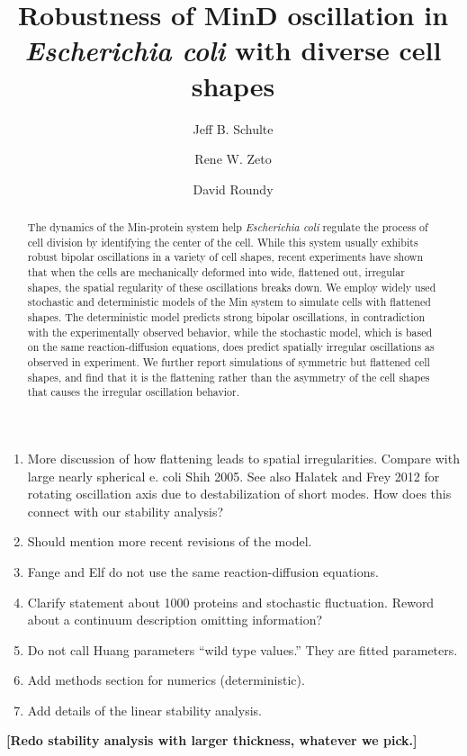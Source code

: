\documentclass[letterpaper,twocolumn,amsmath,amssymb,pre]{revtex4-1}
\newcommand{\red}[1]{{\bf \color{red} #1}}
\newcommand{\fixme}[1]{\red{[#1]}}
\begin{document}
{\begin{enumerate}
  \item More discussion of how flattening leads to spatial
    irregularities.  Compare with large nearly spherical e. coli Shih
    2005.  See also Halatek and Frey 2012 for rotating oscillation
    axis due to destabilization of short modes.  How does this connect
    with our stability analysis?
  \item Should mention more recent revisions of the model.
  \item Fange and Elf do not use the same reaction-diffusion
    equations.
  \item Clarify statement about 1000 proteins and stochastic
    fluctuation.  Reword about a continuum description omitting
    information?
  \item Do not call Huang parameters ``wild type values.''  They are
    fitted parameters.
  \item Add methods section for numerics (deterministic).
  \item Add details of the linear stability analysis.
  \end{enumerate}
}

\fixme{Redo stability analysis with larger thickness, whatever we pick.}
\title{Robustness of MinD oscillation in \emph{Escherichia coli} with
  diverse cell shapes}

\author{Jeff B. Schulte}
\author{Rene W. Zeto}
\author{David Roundy}


\begin{abstract}
  The dynamics of the Min-protein system help \emph{Escherichia coli}
  regulate the process of cell division by identifying the center of
  the cell.  While this system usually exhibits robust bipolar
  oscillations in a variety of cell shapes, recent experiments have
  shown that when the cells are mechanically deformed into wide,
  flattened out, irregular shapes, the spatial regularity of these
  oscillations breaks down. We employ widely used stochastic and
  deterministic models of the Min system to simulate cells with flattened
  shapes.  The deterministic model predicts strong bipolar
  oscillations, in contradiction with the experimentally observed
  behavior, while the stochastic model, which is based on the same
  reaction-diffusion equations, does predict spatially irregular
  oscillations as observed in experiment.  We further report
  simulations of symmetric but flattened cell shapes, and find that it
  is the flattening rather than the asymmetry of the cell shapes that
  causes the irregular oscillation behavior.
\end{abstract}
\end{document}
